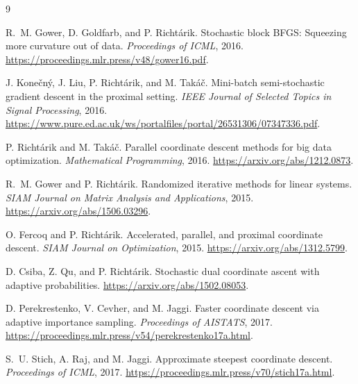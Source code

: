 \documentclass[11pt]{article}
\begin{document}
\begin{thebibliography}{9}

R.~M. Gower, D. Goldfarb, and P. Richtárik.
\newblock Stochastic block BFGS: Squeezing more curvature out of data.
\newblock \emph{Proceedings of ICML}, 2016.
\newblock
\url{https://proceedings.mlr.press/v48/gower16.pdf}.

J. Konečný, J. Liu, P. Richtárik, and M. Takáč.
\newblock Mini-batch semi-stochastic gradient descent in the proximal
setting.
\newblock \emph{IEEE Journal of Selected Topics in Signal Processing},
2016.
\newblock
\url{https://www.pure.ed.ac.uk/ws/portalfiles/portal/26531306/07347336.pdf}.

P. Richtárik and M. Takáč.
\newblock Parallel coordinate descent methods for big data optimization.
\newblock \emph{Mathematical Programming}, 2016.
\newblock
\url{https://arxiv.org/abs/1212.0873}.

R.~M. Gower and P. Richtárik.
\newblock Randomized iterative methods for linear systems.
\newblock \emph{SIAM Journal on Matrix Analysis and Applications}, 2015.
\newblock
\url{https://arxiv.org/abs/1506.03296}.

O. Fercoq and P. Richtárik.
\newblock Accelerated, parallel, and proximal coordinate descent.
\newblock \emph{SIAM Journal on Optimization}, 2015.
\newblock
\url{https://arxiv.org/abs/1312.5799}.

D. Csiba, Z. Qu, and P. Richtárik.
\newblock Stochastic dual coordinate ascent with adaptive probabilities.
\newblock
\url{https://arxiv.org/abs/1502.08053}.

D. Perekrestenko, V. Cevher, and M. Jaggi.
\newblock Faster coordinate descent via adaptive importance sampling.
\newblock \emph{Proceedings of AISTATS}, 2017.
\newblock
\url{https://proceedings.mlr.press/v54/perekrestenko17a.html}.

S.~U. Stich, A. Raj, and M. Jaggi.
\newblock Approximate steepest coordinate descent.
\newblock \emph{Proceedings of ICML}, 2017.
\newblock
\url{https://proceedings.mlr.press/v70/stich17a.html}.

\end{thebibliography}
\end{document}
